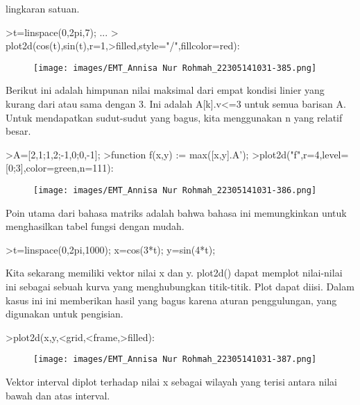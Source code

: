 \documentclass[a4paper,10pt]{article}
\begin{document}
\begin{eulernotebook}
\begin{eulercomment}
lingkaran satuan.
\end{eulercomment}
\begin{eulerprompt}
>t=linspace(0,2pi,7);  ...
> plot2d(cos(t),sin(t),r=1,>filled,style="/",fillcolor=red):
\end{eulerprompt}
\begin{figure}[h]
    \centering
    \texttt{[image: images/EMT\_Annisa Nur Rohmah\_22305141031-385.png]}
\end{figure}
\begin{eulercomment}
Berikut ini adalah himpunan nilai maksimal dari empat kondisi linier
yang kurang dari atau sama dengan 3. Ini adalah A[k].v\textless{}=3 untuk semua
barisan A. Untuk mendapatkan sudut-sudut yang bagus, kita menggunakan
n yang relatif besar.
\end{eulercomment}
\begin{eulerprompt}
>A=[2,1;1,2;-1,0;0,-1];
>function f(x,y) := max([x,y].A');
>plot2d("f",r=4,level=[0;3],color=green,n=111):
\end{eulerprompt}
\begin{figure}[h]
    \centering
    \texttt{[image: images/EMT\_Annisa Nur Rohmah\_22305141031-386.png]}
\end{figure}
\begin{eulercomment}
Poin utama dari bahasa matriks adalah bahwa bahasa ini memungkinkan
untuk menghasilkan tabel fungsi dengan mudah.
\end{eulercomment}
\begin{eulerprompt}
>t=linspace(0,2pi,1000); x=cos(3*t); y=sin(4*t);
\end{eulerprompt}
\begin{eulercomment}
Kita sekarang memiliki vektor nilai x dan y. plot2d() dapat memplot
nilai-nilai ini sebagai sebuah kurva yang menghubungkan titik-titik.
Plot dapat diisi. Dalam kasus ini ini memberikan hasil yang bagus
karena aturan penggulungan, yang digunakan untuk pengisian.
\end{eulercomment}
\begin{eulerprompt}
>plot2d(x,y,<grid,<frame,>filled):
\end{eulerprompt}
\begin{figure}[h]
    \centering
    \texttt{[image: images/EMT\_Annisa Nur Rohmah\_22305141031-387.png]}
\end{figure}
\begin{eulercomment}
Vektor interval diplot terhadap nilai x sebagai wilayah yang terisi
antara nilai bawah dan atas interval.


\end{eulercomment}
\end{eulernotebook}
\end{document}
